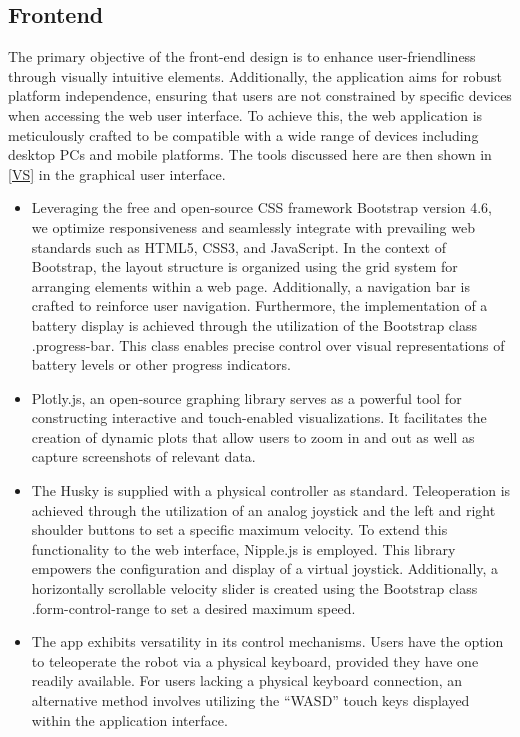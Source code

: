 \documentclass[conference]{IEEEtran}
\begin{document}
\subsection{Frontend}
The primary objective of the front-end design is to enhance user-friendliness through visually intuitive elements. Additionally, the application aims for robust platform independence, ensuring that users are not constrained by specific devices when accessing the web user interface. 
To achieve this, the web application is meticulously crafted to be compatible with a wide range of devices including desktop PCs and mobile platforms. The tools discussed here are then shown in \ref{VS} in the graphical user interface.
\begin{itemize}
\item Leveraging the free and open-source CSS framework Bootstrap version 4.6, we optimize responsiveness and seamlessly integrate with prevailing web standards such as HTML5, CSS3, and JavaScript. 
In the context of Bootstrap, the layout structure is organized using the grid system for arranging elements within a web page. 
Additionally, a navigation bar is crafted to reinforce user navigation.
Furthermore, the implementation of a battery display is achieved through the utilization of the Bootstrap class .progress-bar. 
This class enables precise control over visual representations of battery levels or other progress indicators.
\item Plotly.js, an open-source graphing library serves as a powerful tool for constructing interactive and touch-enabled visualizations. It facilitates the creation of dynamic plots that allow users to zoom in and out as well as capture screenshots of relevant data.
\item The Husky is supplied with a physical controller as standard. Teleoperation is achieved through the utilization of an analog joystick and the left and right shoulder buttons to set a specific maximum velocity.
To extend this functionality to the web interface, Nipple.js is employed. This library empowers the configuration and display of a virtual joystick. Additionally, a horizontally scrollable velocity slider is created using the Bootstrap class .form-control-range to set a desired maximum speed.
\item The app exhibits versatility in its control mechanisms. Users have the option to teleoperate the robot via a physical keyboard, provided they have one readily available. For users lacking a physical keyboard connection, an alternative method involves utilizing the “WASD” touch keys displayed within the application interface. 

\end{itemize}
\end{document}
